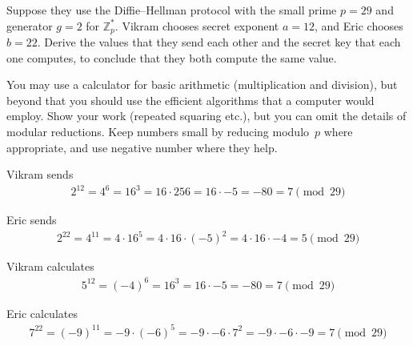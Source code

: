\documentclass[12pt, letterpaper]{article}
\newcommand{\Z}{\mathbb{Z}}
\begin{document}
\begin{subproblem}{}
    Suppose they use the Diffie--Hellman protocol with the small prime $p=29$ and generator $g=2$ for $\Z_p^*$.
    Vikram chooses secret exponent $a=12$, and Eric chooses $b=22$.
    Derive the values that they send each other and the secret key that each one computes, to conclude that they both compute the same value.

    You may use a calculator for basic arithmetic (multiplication and division), but beyond that you should use the efficient algorithms that a computer would employ.
    Show your work (repeated squaring etc.), but you can omit the details of modular reductions.
    Keep numbers small by reducing modulo~$p$ where appropriate, and use negative number where they help.
\end{subproblem}
\begin{problemproof}
    Vikram sends
    \begin{align*}
        2^{12}=4^6=16^3=16 \cdot 256=16 \cdot -5=-80=7 \pmod{29}
    \end{align*}

    Eric sends
    \begin{align*}
        2^{22}=4^11=4 \cdot 16^5=4 \cdot 16 \cdot (-5)^{2}=4 \cdot 16 \cdot -4=5 \pmod{29}
    \end{align*}

    Vikram calculates
    \begin{align*}
        5^{12}=(-4)^{6}=16^3=16 \cdot -5=-80=7 \pmod{29}
    \end{align*}

    Eric calculates
    \begin{align*}
        7^{22}=(-9)^{11}=-9 \cdot (-6)^{5}=-9 \cdot -6 \cdot 7^{2}=-9 \cdot -6 \cdot -9=7 \pmod{29}
    \end{align*}
\end{problemproof}
\end{document}
